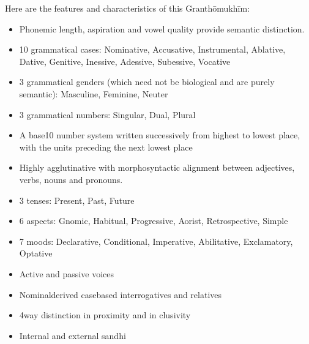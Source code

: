 \documentclass[14pt,oneside]{book}
\begin{document}
\noindent Here are the features and characteristics of this Granthōmukhīm:

\begin{itemize}[itemsep=-2.5pt]

    \item Phonemic length, aspiration and vowel quality provide semantic distinction.

    \item 10 grammatical cases: Nominative, Accusative, Instrumental, Ablative, Dative, Genitive, Inessive, Adessive, Subessive, Vocative
    
    \item 3 grammatical genders (which need not be biological and are purely semantic): Masculine, Feminine, Neuter
    
    \item 3 grammatical numbers: Singular, Dual, Plural

    \item A base{\textendash}10 number system written successively from highest to lowest place, with the units preceding the next lowest place

    \item Highly agglutinative with morphosyntactic alignment between adjectives, verbs, nouns and pronouns.

    \item 3 tenses: Present, Past, Future

    \item 6 aspects: Gnomic, Habitual, Progressive, Aorist, Retrospective, Simple

    \item 7 moods: Declarative, Conditional, Imperative, Abilitative, Exclamatory, Optative

    \item Active and passive voices

    \item Nominal{\textendash}derived case{\textendash}based interrogatives and relatives

    \item 4{\textendash}way distinction in proximity and in clusivity

    \item Internal and external sandhi

\end{itemize}
\end{document}
